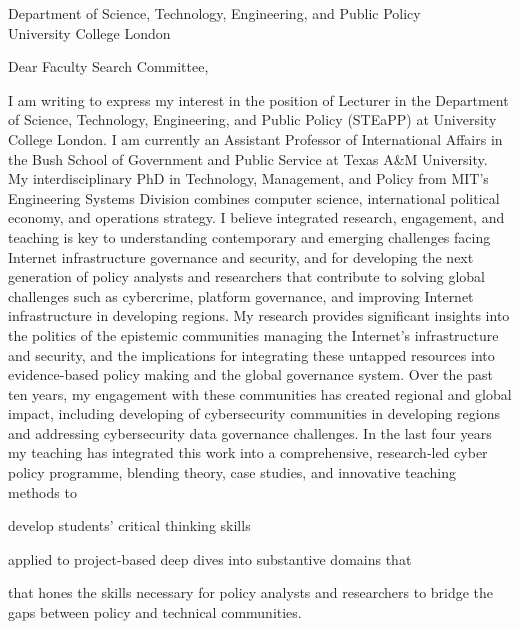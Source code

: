 \documentclass[11pt]{letter}
\begin{document}
\begin{letter}
{
  Department of Science, Technology, Engineering, and Public Policy \\ 
  University College London
}

\opening{Dear Faculty Search Committee,}

I am writing to express my interest in the position of Lecturer in the Department of Science, Technology, Engineering, and Public Policy (STEaPP) at University College London.  
%
I am currently an Assistant Professor of International Affairs in the Bush School of Government and Public Service at Texas A\&M University.  
%
My interdisciplinary PhD in Technology, Management, and Policy from MIT's Engineering Systems Division combines computer science, international political economy, and operations strategy.
%
I believe integrated research, engagement, and teaching is key to understanding contemporary and emerging challenges facing Internet infrastructure governance and security, and for developing the next generation of policy analysts and researchers that contribute to solving global challenges such as cybercrime, platform governance, and improving Internet infrastructure in developing regions.  
%
My research provides significant insights into the politics of the epistemic communities managing the Internet's infrastructure and security, and the implications for integrating these untapped resources into evidence-based policy making and the global governance system.
%
Over the past ten years, my engagement with these communities has created  regional and global impact, including developing of cybersecurity communities in developing regions and addressing cybersecurity data governance challenges.
%
In the last four years my teaching has integrated this work into a comprehensive, research-led cyber policy programme, blending theory, case studies, and innovative teaching methods to %
\begin{inparaenum}
  \item develop students' critical thinking skills 
  \item applied to project-based deep dives into substantive domains that
  \item that hones the skills necessary for policy analysts and researchers to bridge the gaps between policy and technical communities.
\end{inparaenum}
%


\end{letter}
\end{document}
